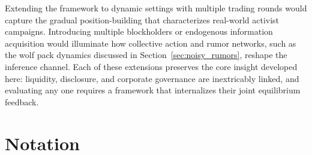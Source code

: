 \documentclass[11pt]{article}
\newcommand{\1}{\mathbf{1}}
\begin{document}
Extending the framework to dynamic settings with multiple trading rounds would capture the gradual position-building that characterizes real-world activist campaigns. Introducing multiple blockholders or endogenous information acquisition would illuminate how collective action and rumor networks, such as the wolf pack dynamics discussed in Section~\ref{sec:noisy_rumors}, reshape the inference channel. Each of these extensions preserves the core insight developed here: liquidity, disclosure, and corporate governance are inextricably linked, and evaluating any one requires a framework that internalizes their joint equilibrium feedback.

\newpage
\printbibliography

\newpage
\appendix

\section{Notation}
\label{app:notation}
\end{document}

